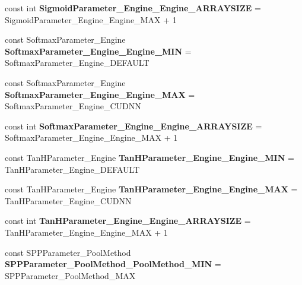 \begin{DoxyCompactItemize}
const int {\bfseries Sigmoid\+Parameter\+\_\+\+Engine\+\_\+\+Engine\+\_\+\+A\+R\+R\+A\+Y\+S\+I\+ZE} = Sigmoid\+Parameter\+\_\+\+Engine\+\_\+\+Engine\+\_\+\+M\+AX + 1
\item 
\mbox{\label{namespacecaffe_acc213eb5d8f8f5a970ff7ca659ea69f6}} 
const Softmax\+Parameter\+\_\+\+Engine {\bfseries Softmax\+Parameter\+\_\+\+Engine\+\_\+\+Engine\+\_\+\+M\+IN} = Softmax\+Parameter\+\_\+\+Engine\+\_\+\+D\+E\+F\+A\+U\+LT
\item 
\mbox{\label{namespacecaffe_ab328ea7d0c2c2cab2bcbd375973789ac}} 
const Softmax\+Parameter\+\_\+\+Engine {\bfseries Softmax\+Parameter\+\_\+\+Engine\+\_\+\+Engine\+\_\+\+M\+AX} = Softmax\+Parameter\+\_\+\+Engine\+\_\+\+C\+U\+D\+NN
\item 
\mbox{\label{namespacecaffe_adf91d07e41e9c3a6fcd0118c4628d87f}} 
const int {\bfseries Softmax\+Parameter\+\_\+\+Engine\+\_\+\+Engine\+\_\+\+A\+R\+R\+A\+Y\+S\+I\+ZE} = Softmax\+Parameter\+\_\+\+Engine\+\_\+\+Engine\+\_\+\+M\+AX + 1
\item 
\mbox{\label{namespacecaffe_a1213347d39afc7614f5bc6b00de52341}} 
const Tan\+H\+Parameter\+\_\+\+Engine {\bfseries Tan\+H\+Parameter\+\_\+\+Engine\+\_\+\+Engine\+\_\+\+M\+IN} = Tan\+H\+Parameter\+\_\+\+Engine\+\_\+\+D\+E\+F\+A\+U\+LT
\item 
\mbox{\label{namespacecaffe_ac28f6d665a4613ea8fea0f6d55e19cee}} 
const Tan\+H\+Parameter\+\_\+\+Engine {\bfseries Tan\+H\+Parameter\+\_\+\+Engine\+\_\+\+Engine\+\_\+\+M\+AX} = Tan\+H\+Parameter\+\_\+\+Engine\+\_\+\+C\+U\+D\+NN
\item 
\mbox{\label{namespacecaffe_a7fda3de63b2fe8bb136757b03a2dd085}} 
const int {\bfseries Tan\+H\+Parameter\+\_\+\+Engine\+\_\+\+Engine\+\_\+\+A\+R\+R\+A\+Y\+S\+I\+ZE} = Tan\+H\+Parameter\+\_\+\+Engine\+\_\+\+Engine\+\_\+\+M\+AX + 1
\item 
\mbox{\label{namespacecaffe_a259bf9a4924435068398bc671ae8eeae}} 
const S\+P\+P\+Parameter\+\_\+\+Pool\+Method {\bfseries S\+P\+P\+Parameter\+\_\+\+Pool\+Method\+\_\+\+Pool\+Method\+\_\+\+M\+IN} = S\+P\+P\+Parameter\+\_\+\+Pool\+Method\+\_\+\+M\+AX
\item 

\end{DoxyCompactItemize}
